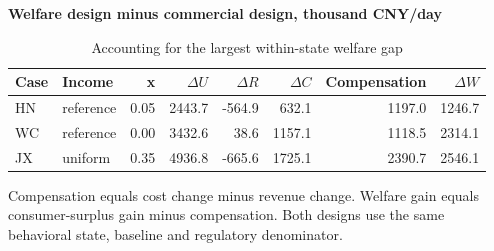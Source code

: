 \begin{table}[htbp]\centering
\caption{Accounting for the largest within-state welfare gap}\label{tab:round2_gov}
\begin{minipage}{.95\textwidth}\fontsize{8}{10}\selectfont{}\setlength{\tabcolsep}{2pt}\renewcommand{\arraystretch}{1.08}
\par\noindent\textbf{Welfare design minus commercial design, thousand CNY/day}\par\smallskip
\begin{tabular*}{\linewidth}{@{\extracolsep{\fill}}llrrrrrr@{}}\toprule
Case & Income & x & $\Delta U$ & $\Delta R$ & $\Delta C$ & Compensation & $\Delta W$ \\
\midrule
HN & reference & 0.05 & 2443.7 & -564.9 & 632.1 & 1197.0 & 1246.7 \\
WC & reference & 0.00 & 3432.6 & 38.6 & 1157.1 & 1118.5 & 2314.1 \\
JX & uniform & 0.35 & 4936.8 & -665.6 & 1725.1 & 2390.7 & 2546.1 \\
\bottomrule\end{tabular*}\par\medskip
\par\noindent\fontsize{8}{9.5}\selectfont Compensation equals cost change minus revenue change. Welfare gain equals consumer-surplus gain minus compensation. Both designs use the same behavioral state, baseline and regulatory denominator.
\end{minipage}\end{table}
